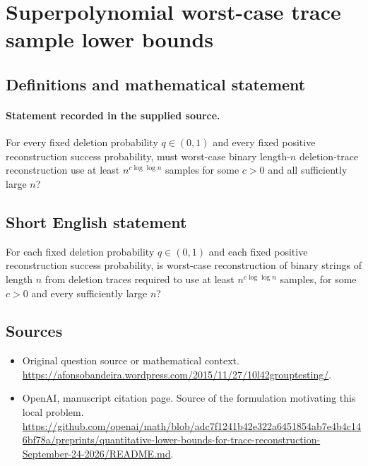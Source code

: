 \documentclass[11pt]{article}
\begin{document}
\section*{Superpolynomial worst-case trace sample lower bounds}\label{statement}
\subsection{Definitions and mathematical statement}
\paragraph{Statement recorded in the supplied source.}
For every fixed deletion probability $q\in(0,1)$ and every fixed positive reconstruction success probability, must worst-case binary length-$n$ deletion-trace reconstruction use at least $n^{c\log\log n}$ samples for some $c>0$ and all sufficiently large $n$?
\subsection{Short English statement}
For each fixed deletion probability $q\in(0,1)$ and each fixed positive reconstruction success probability, is worst-case reconstruction of binary strings of length $n$ from deletion traces required to use at least $n^{c\log\log n}$ samples, for some $c>0$ and every sufficiently large $n$?
\subsection{Sources}
\begin{itemize}
\item[S1] Original question source or mathematical context.
\url{https://afonsobandeira.wordpress.com/2015/11/27/10l42grouptesting/}.
\item[S2] OpenAI, manuscript citation page. Source of the formulation motivating this local problem.
\url{https://github.com/openai/math/blob/adc7f1241b42e322a6451854ab7e4b4c146bf78a/preprints/quantitative-lower-bounds-for-trace-reconstruction-September-24-2026/README.md}.
\end{itemize}
\end{document}
